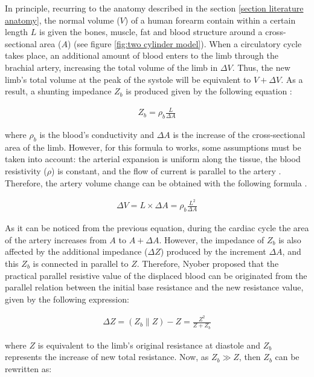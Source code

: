 In principle, recurring to the anatomy described in the section \ref{section literature anatomy}, the normal volume ($V$) of a human forearm contain within a certain length $L$ is given the bones, muscle, fat and blood structure around a cross-sectional area ($A$) (see figure \ref{fig:two cylinder model}). When a circulatory cycle takes place, an additional amount of blood enters to the limb through the brachial artery, increasing the total volume of the limb in $\Delta V$. Thus, the new limb's total volume at the peak of the systole will be equivalent to $V + \Delta V$. As a result, a shunting impedance $Z_b$ is produced given by the following equation \cite{swanson1976origin, webster2009medical}:

\begin{align}
	\label{eq:blood impedance}
	Z_b = \rho_b \frac{L}{\Delta A}
\end{align}

where $\rho_b$ is the blood's conductivity and $\Delta A$ is the increase of the cross-sectional area of the limb. However, for this formula to works, some assumptions must be taken into account: the arterial expansion is uniform along the tissue, the blood resistivity ($\rho$) is constant, and the flow of current is parallel to the artery \cite{bera2014bioelectrical}. Therefore, the artery volume change can be obtained with the following formula \cite{swanson1976origin, webster2009medical}.

\begin{align}
	\label{eq:delta volume}
	\Delta V = L \times \Delta A = \rho_b \frac{L^2}{\Delta A}
\end{align}

As it can be noticed from the previous equation, during the cardiac cycle the area of the artery increases from $A$ to $A + \Delta A$. However, the impedance of $Z_b$ is also affected by the additional impedance ($\Delta Z$) produced by the increment $\Delta A$, and this $Z_b$ is connected in parallel to $Z$. Therefore, Nyober \cite{nyober1950electrical} proposed that the practical parallel resistive value of the displaced blood can be originated from the parallel relation between the initial base resistance and the new resistance value, given by the following expression:

\begin{align}
	\label{eq:parallel model}
	\Delta Z = (Z_b \parallel Z) - Z = \frac{Z^2}{Z + Z_b}
\end{align}

where $Z$ is equivalent to the limb's original resistance at diastole and $Z_b$ represents the increase of new total resistance. Now, as $Z_b \gg Z$, then $Z_b$ can be rewritten as:

